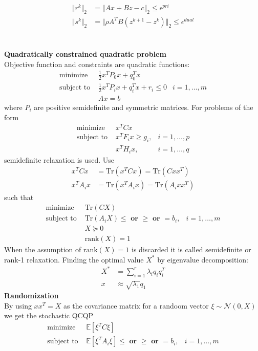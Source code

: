 \documentclass[12pt,a4paper]{report}
\begin{document}
\begin{align*}
\Vert r^k\Vert_2&=\Vert Ax+Bz-c\Vert_2\leq \epsilon^{pri}\\
\Vert s^k\Vert_2&=\Vert\rho A^TB(z^{k+1}-z^k)\Vert_2\leq\epsilon^{dual}
\end{align*}
\clearpage
{}\\\\
\textbf{Quadratically constrained quadratic problem}\\
Objective function and constraints are quadratic functions:
\begin{align*}
\text{minimize }&\tfrac{1}{2}x^TP_0x+q_0^Tx\\
\text{subject to }&\tfrac{1}{2}x^TP_ix+q_i^Tx+r_i\leq0&i=1,\ldots,m\\
&Ax=b
\end{align*}
where $P_i$ are positive semidefinite and symmetric matrices.
For problems of the form
\begin{align*}
\text{minimize }&x^TCx\\
\text{subject to }&x^TF_ix\geq g_i,&i=1,\ldots,p\\
&x^TH_ix,&i=1,\ldots,q
\end{align*}
semidefinite relaxation is used. Use
\begin{align*}
x^TCx&=\mathrm{Tr}(x^TCx)=\mathrm{Tr}(Cxx^T)\\
x^TA_ix&=\mathrm{Tr}(x^TA_ix)=\mathrm{Tr}(A_ixx^T)
\end{align*}
such that
\begin{align*}
\text{minimize }&\mathrm{Tr}(CX)\\
\text{subject to }&\mathrm{Tr}(A_iX)\leq\textbf{ or }\geq\textbf{ or }=b_i,&i=1,\ldots,m\\
&X\succeq 0\\
&\mathrm{rank}(X)=1
\end{align*}
When the assumption of $\mathrm{rank}(X)=1$ is discarded it is called semidefinite or rank-1 relaxation. Finding the optimal value $X^*$ by eigenvalue decomposition:
\begin{align*}
X^*&=\sum_{i=1}^r\lambda_iq_iq_i^T\\
x&\approx\sqrt{\lambda_1}q_1
\end{align*}
\textbf{Randomization}\\
By using $xx^T=X$ as the covariance matrix for a randoom vector $\xi\sim\mathcal{N}(0,X)$ we get the stochastic QCQP
\begin{align*}
\text{minimize }&\mathbb{E}[\xi^TC\xi]\\
\text{subject to }&\mathbb{E}[\xi^TA_i\xi]\leq\textbf{ or }\geq\textbf{ or }=b_i,&i=1,\ldots,m
\end{align*}
\end{document}
